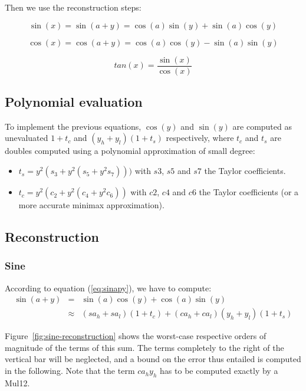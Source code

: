 Then we use the reconstruction steps:

\begin{equation}        
  \sin(x) = \sin(a + y) =  \cos(a) \sin(y) +  \sin(a) \cos(y) 
  \label{eq:sinapy}
\end{equation}

\begin{equation}
  \cos(x) = \cos(a + y) = \cos(a) \cos(y) -  \sin(a) \sin(y) 
  \label{eq:cosapy}
\end{equation}

\begin{equation} 
  tan(x) = \frac{\sin(x)}{\cos(x)} 
  \label{eq:tanapy}
\end{equation}


\subsection{Polynomial evaluation}


To implement the previous equations, $\cos(y)$ and $\sin(y)$ are
computed as unevaluated $1+t_c$ and $(y_h+y_l)(1+t_s)$ respectively,
where $t_c$ and $t_s$ are doubles computed using a polynomial
approximation of small degree:

\begin{itemize}
\item $t_s = y^2(s_3 + y^2(s_5 + y^2s_7)))$ with $s3$, $s5$ and
$s7$ the Taylor coefficients.
\item $t_c = y^2(c_2 + y^2(c_4 + y^2c_6))$ with $c2$, $c4$ and $c6$ the
Taylor coefficients (or a more accurate minimax approximation).
\end{itemize}



\subsection{Reconstruction}

\subsubsection{Sine}
According to equation (\ref{eq:sinapy}), we have to compute: 
 \begin{eqnarray*}
  \sin(a+y) &=& \sin(a) \cos(y)  + \cos(a)\sin(y)  \\
  & \approx& (sa_h+sa_l)(1+t_c) + (ca_h+ca_l)(y_h+y_l)(1+t_s)
\end{eqnarray*}


Figure~\ref{fig:sine-reconstruction} shows the worst-case respective
orders of magnitude of the terms of this sum. The terms completely to the
right of the vertical bar will be neglected, and a bound on the
error thus entailed is computed in the following. Note that the term
$ca_hy_h$ has to be computed exactly by a Mul12.

